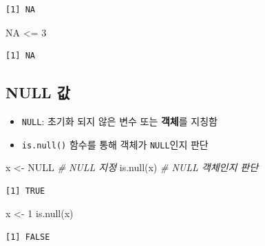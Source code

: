 \documentclass[
  11pt,
]{krantz}
\newenvironment{Shaded}{\begin{snugshade}}{\end{snugshade}}
\newcommand{\CommentTok}[1]{\textcolor[rgb]{0.37,0.37,0.37}{\textit{#1}}}
\newcommand{\ConstantTok}[1]{\textcolor[rgb]{0,0,0}{#1}}
\newcommand{\DecValTok}[1]{\textcolor[rgb]{0.06,0.06,0.06}{#1}}
\newcommand{\FunctionTok}[1]{\textcolor[rgb]{0,0,0}{#1}}
\newcommand{\NormalTok}[1]{#1}
\newcommand{\OtherTok}[1]{\textcolor[rgb]{0.37,0.37,0.37}{#1}}
\newcommand{\SpecialCharTok}[1]{\textcolor[rgb]{0,0,0}{#1}}
\providecommand{\tightlist}{%
  \setlength{\itemsep}{0pt}\setlength{\parskip}{0pt}}
\begin{document}
\begin{verbatim}
[1] NA
\end{verbatim}

\begin{Shaded}
\begin{Highlighting}[]
\ConstantTok{NA} \SpecialCharTok{\textless{}=} \DecValTok{3}
\end{Highlighting}
\end{Shaded}

\begin{verbatim}
[1] NA
\end{verbatim}

\normalsize

\hypertarget{null}{%
\subsection{NULL 값}\label{null}}

\begin{itemize}
\tightlist
\item
  \texttt{NULL}: 초기화 되지 않은 변수 또는 \textbf{객체}를 지칭함
\item
  \texttt{is.null()} 함수를 통해 객체가 \texttt{NULL}인지 판단
\end{itemize}

\footnotesize

\begin{Shaded}
\begin{Highlighting}[]
\NormalTok{x }\OtherTok{\textless{}{-}} \ConstantTok{NULL} \CommentTok{\# NULL 지정}
\FunctionTok{is.null}\NormalTok{(x) }\CommentTok{\# NULL 객체인지 판단}
\end{Highlighting}
\end{Shaded}

\begin{verbatim}
[1] TRUE
\end{verbatim}

\begin{Shaded}
\begin{Highlighting}[]
\NormalTok{x }\OtherTok{\textless{}{-}} \DecValTok{1}
\FunctionTok{is.null}\NormalTok{(x) }
\end{Highlighting}
\end{Shaded}

\begin{verbatim}
[1] FALSE
\end{verbatim}

\normalsize

\footnotesize
\end{document}
